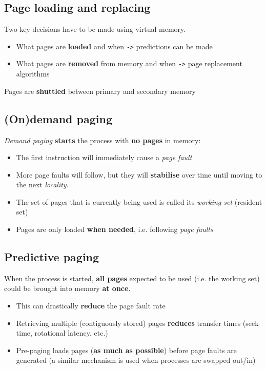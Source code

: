 \documentclass{article}
\begin{document}
\subsection{Page loading and replacing}
\begin{flushleft}
Two key decisions have to be made using virtual memory.
\begin{itemize}
	\item What pages are \textbf{loaded} and when \verb!->! predictions can be made
	\item What pages are \textbf{removed} from memory and when \verb!->! page replacement algorithms 
\end{itemize}
Pages are \textbf{shuttled} between primary and secondary memory
\end{flushleft}

\subsection{(On)demand paging}
\begin{flushleft}
\textit{Demand paging} \textbf{starts} the process with \textbf{no pages} in memory:
\begin{itemize}
	\item The first instruction will immediately cause a \textit{page fault}
	\item More page faults will follow, but they will \textbf{stabilise} over time until moving to the next \textit{locality}.
	\item The set of pages that is currently being used is called its \textit{working set} (resident set)
	\item Pages are only loaded \textbf{when needed}, i.e. following \textit{page faults}
\end{itemize}
\end{flushleft}

\subsection{Predictive paging}
\begin{flushleft}
When the process is started, \textbf{all pages} expected to be used (i.e. the working set) could be brought into memory \textbf{at once}.
\begin{itemize}
	\item This can drastically \textbf{reduce} the page fault rate
	\item Retrieving multiple (contiguously stored) pages \textbf{reduces} transfer times (seek time, rotational latency, etc.) 
	\item Pre-paging loads pages (\textbf{as much as possible}) before page faults are generated (a similar mechanism is used when processes are swapped out/in)
\end{itemize}
\end{flushleft}
\end{document}
